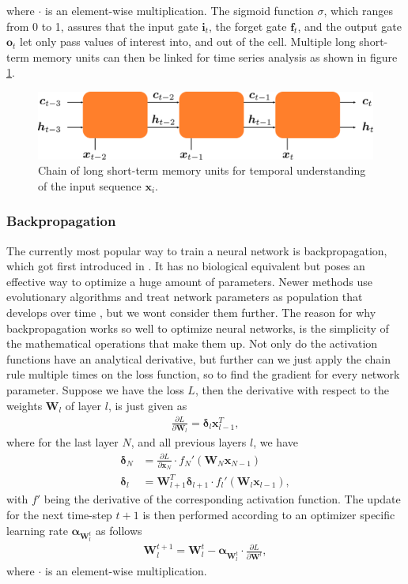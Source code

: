 where $\cdot$ is an element-wise multiplication. The sigmoid function $\sigma$, which ranges from 0 to 1, assures that the input gate $\bm{i}_t$, the forget gate $\bm{f}_t$, and the output gate $\bm{o}_t$ let only pass values of interest into, and out of the cell. Multiple long short-term memory units can then be linked for time series analysis as shown in figure \ref{fig::221_lstm_chain}.
\begin{figure}[h!]
	\centering
	\includegraphics[scale=.28]{chapters/02_background/img/lstm_chain.png}
	\caption{Chain of long short-term memory units for temporal understanding of the input sequence $\bm{x}_i$.}
	\label{fig::221_lstm_chain}
\end{figure}
\subsubsection{Backpropagation}
The currently most popular way to train a neural network is backpropagation, which got first introduced in \cite{linnainmaa1970representation}. It has no biological equivalent but poses an effective way to optimize a huge amount of parameters. Newer methods use evolutionary algorithms and treat network parameters as population that develops over time \cite{montana1989training}, but we wont consider them further. The reason for why backpropagation works so well to optimize neural networks, is the simplicity of the mathematical operations that make them up. Not only do the activation functions have an analytical derivative, but further can we just apply the chain rule multiple times on the loss function, so to find the gradient for every network parameter. Suppose we have the loss $L$, then the derivative with respect to the weights $\bm{W}_l$ of layer $l$, is just given as
\begin{align}
	\frac{\partial L}{\partial \bm{W}_l} = \bm{\delta}_l\bm{x}_{l-1}^T,
	\label{eq::221_bp}
\end{align}
where for the last layer $N$, and all previous layers $l$, we have
\begin{align}
	\bm{\delta}_N &= \frac{\partial L}{\partial \bm{x}_N} \cdot f_N'(\bm{W}_N\bm{x}_{N-1}) \\
	\bm{\delta}_l &= \bm{W}^T_{l+1}\bm{\delta}_{l+1} \cdot f_{l}'(\bm{W}_l\bm{x}_{l-1}),
\end{align} %
with $f'$ being the derivative of the corresponding activation function. The update for the next time-step $t+1$ is then performed according to an optimizer specific learning rate $\bm{\alpha}_{\bm{W}^t_l}$ as follows
\begin{align}
	\bm{W}_l^{t+1} = \bm{W}_l^t - \bm{\alpha}_{\bm{W}^t_l}\cdot\frac{\partial L}{\partial \bm{W}^l},
\end{align}
where $\cdot$ is an element-wise multiplication.